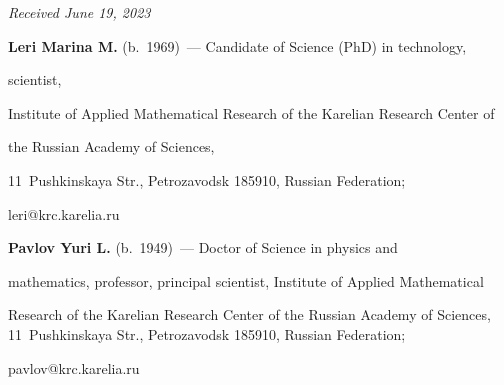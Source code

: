 \hfill{\small\textit{Received June 19, 2023}} 





\vspace*{-18pt}


     


     \Contr


     


     \vspace*{-3pt}





\noindent


\textbf{Leri Marina M.} (b.\ 1969)~--- Candidate of Science (PhD) in technology, 


scientist,


Institute of Applied Mathematical Research of the Karelian Research Center of 


the Russian Academy of Sciences,


11~Pushkinskaya Str., Petrozavodsk 185910, Russian Federation; 


\mbox{leri@krc.karelia.ru}





\vspace*{3pt}





\noindent


\textbf{Pavlov Yuri L.} (b.\ 1949)~--- Doctor of Science in physics and 


mathematics, professor, principal scientist, Institute of Applied Mathematical 


Research of the Karelian Research Center of the Russian Academy of Sciences, 11~Pushkinskaya Str., Petrozavodsk 185910, Russian Federation; 


\mbox{pavlov@krc.karelia.ru}











\label{end\stat}





\renewcommand{\bibname}{\protect\rm Литература} 


